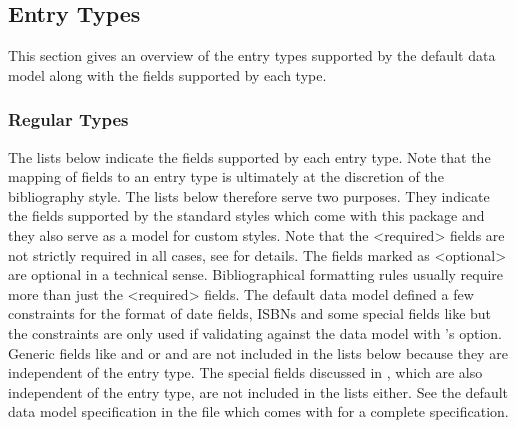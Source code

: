 \documentclass{ltxdockit}[2011/03/25]
\newcommand*{\biber}{\sty{biber}\xspace}
\newcommand*{\biblatex}{\sty{biblatex}\xspace}
\begin{document}
\subsection{Entry Types}
\label{bib:typ}

This section gives an overview of the entry types supported by the default \biblatex data model along with the fields supported by each type.

\subsubsection{Regular Types}
\label{bib:typ:blx}

The lists below indicate the fields supported by each entry type. Note that the mapping of fields to an entry type is ultimately at the discretion of the bibliography style. The lists below therefore serve two purposes. They indicate the fields supported by the standard styles which come with this package and they also serve as a model for custom styles. Note that the <required> fields are not strictly required in all cases, see  for details. The fields marked as <optional> are optional in a technical sense. Bibliographical formatting rules usually require more than just the <required> fields. The default data model defined a few constraints for the format of date fields, ISBNs and some special fields like  but the constraints are only used if validating against the data model with \biber's  option. Generic fields like  and  or  and  are not included in the lists below because they are independent of the entry type. The special fields discussed in , which are also independent of the entry type, are not included in the lists either. See the default data model specification in the file  which comes with \biblatex for a complete specification.
\end{document}
